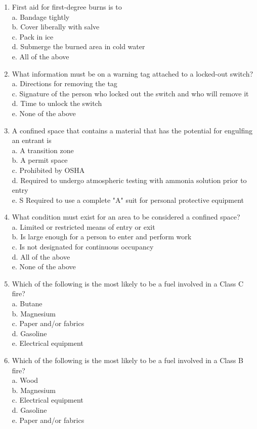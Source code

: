 \begin{enumerate}[1.]
  \item First aid for first-degree burns is to\\
a. Bandage tightly\\
b. Cover liberally with salve\\
c. Pack in ice\\
d. Submerge the burned area in cold water\\
e. All of the above\\
  \item What information must be on a warning tag attached to a locked-out switch?\\
a. Directions for removing the tag\\
c. Signature of the person who locked out the switch and who will remove it\\
d. Time to unlock the switch\\
e. None of the above\\
  \item A confined space that contains a material that has the potential for engulfing an entrant is\\
a. A transition zone\\
b. A permit space\\
c. Prohibited by OSHA\\
d. Required to undergo atmospheric testing with ammonia solution prior to entry\\
e. S Required to use a complete "A" suit for personal protective equipment\\
 \item What condition must exist for an area to be considered a confined space?\\
a. Limited or restricted means of entry or exit\\
b. Is large enough for a person to enter and perform work\\
c. Is not designated for continuous occupancy\\
d. All of the above\\
e. None of the above\\
\item Which of the following is the most likely to be a fuel involved in a Class C fire?\\
a. Butane\\
b. Magnesium\\
c. Paper and/or fabrics\\
d. Gasoline\\
e. Electrical equipment\\
  \item Which of the following is the most likely to be a fuel involved in a Class B fire?\\
a. Wood\\
b. Magnesium\\
c. Electrical equipment\\
d. Gasoline\\
e. Paper and/or fabrics\\


\end{enumerate}
